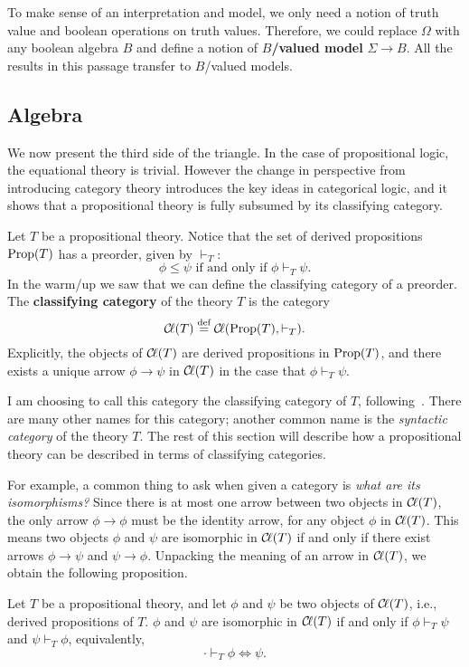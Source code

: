 \documentclass{../thesis-note}
\newcommand\Prop[1]{\text{{\normalfont{Prop}}}{\pwrap{{#1}}}}
\begin{document}
\begin{remark}
  To make sense of an interpretation and model, we only need a notion of truth
  value and boolean operations on truth values. Therefore, we could replace
  \(\Omega\) with any boolean algebra \(B\) and define a notion of
  \textbf{\(B\)\-/valued model} \(\Sigma \to B\). All the results in this
  passage transfer to \(B\)\-/valued models.
\end{remark}

\subsection*{Algebra}

We now present the third side of the triangle. In the case of propositional
logic, the equational theory is trivial. However the change in perspective from
introducing category theory introduces the key ideas in categorical logic, and
it shows that a propositional theory is fully subsumed by its classifying
category.

\begin{definition}
  Let \(T\) be a propositional theory. Notice that the set of derived
  propositions \(\Prop{T}\) has a preorder, given by \(\vdash_T\):
  \[%
    \phi \leq \psi \text{ if and only if } \phi \vdash_T \psi.
  \]%
  In the warm\-/up we saw that we can define the classifying category of a
  preorder. The \textbf{classifying category} of the theory \(T\) is the
  category
  \[%
    \Cl\pwrap{T} \eqdef \Cl\pwrap{\Prop{T},\vdash_T}.
  \]%
  Explicitly, the objects of \({\mathcal{C}\kern-.15em\ell}{\left(T\right)}\) are derived propositions in
  \(\Prop{T}\), and there exists a unique arrow \(\phi \to \psi\) in
  \({\mathcal{C}\kern-.15em\ell}{\left(T\right)}\) in the case that \(\phi \vdash_T \psi\).
\end{definition}
I am choosing to call this category the classifying category of \(T\),
following~\cite{Jacobs1999}. There are many other names for this category;
another common name is the \emph{syntactic category} of the theory \(T\). The
rest of this section will describe how a propositional theory can be described
in terms of classifying categories.

For example, a common thing to ask when given a category is \emph{what are its
  isomorphisms?} Since there is at most one arrow between two objects in
\({\mathcal{C}\kern-.15em\ell}{\left(T\right)}\), the only arrow \(\phi \to \phi\) must be the identity arrow,
for any object \(\phi\) in \({\mathcal{C}\kern-.15em\ell}{\left(T\right)}\). This means two objects \(\phi\) and
\(\psi\) are isomorphic in \({\mathcal{C}\kern-.15em\ell}{\left(T\right)}\) if and only if there exist arrows
\(\phi \to \psi\) and \(\psi \to \phi\). Unpacking the meaning of an arrow in
\({\mathcal{C}\kern-.15em\ell}{\left(T\right)}\), we obtain the following proposition.
\begin{proposition}
  Let \(T\) be a propositional theory, and let \(\phi\) and \(\psi\) be two
  objects of \({\mathcal{C}\kern-.15em\ell}{\left(T\right)}\), i.e., derived propositions of \(T\). \(\phi\) and
  \(\psi\) are isomorphic in \({\mathcal{C}\kern-.15em\ell}{\left(T\right)}\) if and only if \(\phi \vdash_T
  \psi\) and \(\psi \vdash_T \phi\), equivalently,
  \[%
    \cdot \vdash_T \phi \Leftrightarrow \psi.
  \]%
\end{proposition}
\end{document}
